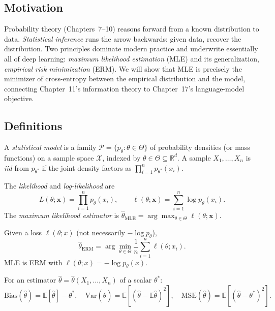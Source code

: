 \subsection*{Motivation}

Probability theory (Chapters~7--10) reasons forward from a known distribution to data. \emph{Statistical inference} runs the arrow backwards: given data, recover the distribution. Two principles dominate modern practice and underwrite essentially all of deep learning: \emph{maximum likelihood estimation} (MLE) and its generalization, \emph{empirical risk minimization} (ERM). We will show that MLE is precisely the minimizer of cross-entropy between the empirical distribution and the model, connecting Chapter~11's information theory to Chapter~17's language-model objective.

\subsection*{Definitions}

\begin{definition}
A \emph{statistical model} is a family $\mathcal{P} = \{p_\theta : \theta \in \Theta\}$ of probability densities (or mass functions) on a sample space $\mathcal{X}$, indexed by $\theta \in \Theta \subseteq \mathbb{R}^d$. A sample $X_1,\dots,X_n$ is \emph{iid} from $p_{\theta^*}$ if the joint density factors as $\prod_{i=1}^n p_{\theta^*}(x_i)$.
\end{definition}

\begin{definition}
The \emph{likelihood} and \emph{log-likelihood} are
\[
L(\theta;\mathbf{x}) = \prod_{i=1}^n p_\theta(x_i), \qquad \ell(\theta;\mathbf{x}) = \sum_{i=1}^n \log p_\theta(x_i).
\]
The \emph{maximum likelihood estimator} is $\hat\theta_{\mathrm{MLE}} = \arg\max_{\theta\in\Theta} \ell(\theta;\mathbf{x})$.
\end{definition}

\begin{definition}
Given a loss $\ell(\theta;x)$ (not necessarily $-\log p_\theta$),
\[
\hat\theta_{\mathrm{ERM}} = \arg\min_{\theta\in\Theta} \frac{1}{n}\sum_{i=1}^n \ell(\theta;x_i).
\]
MLE is ERM with $\ell(\theta;x) = -\log p_\theta(x)$.
\end{definition}

\begin{definition}
For an estimator $\hat\theta = \hat\theta(X_1,\dots,X_n)$ of a scalar $\theta^*$:
\[
\mathrm{Bias}(\hat\theta) = \mathbb{E}[\hat\theta]-\theta^*, \quad
\mathrm{Var}(\hat\theta) = \mathbb{E}[(\hat\theta-\mathbb{E}\hat\theta)^2], \quad
\mathrm{MSE}(\hat\theta) = \mathbb{E}[(\hat\theta-\theta^*)^2].
\]
\end{definition}

